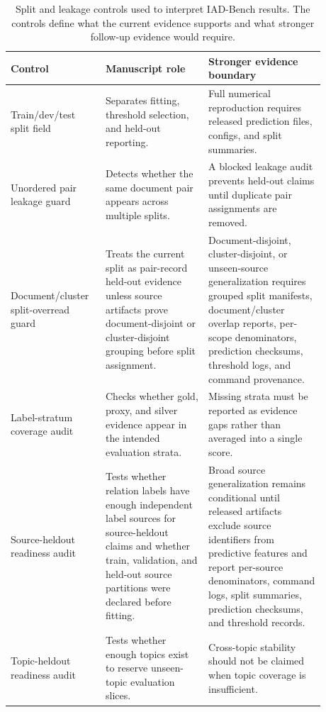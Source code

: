 \documentclass[11pt]{article}
\begin{document}
\begin{table}[H]
\caption{Split and leakage controls used to interpret IAD-Bench results. The controls define what the current evidence supports and what stronger follow-up evidence would require.}
\label{tab:split-leakage-controls}
\centering
\footnotesize
\setlength{\tabcolsep}{3pt}
\begin{tabular}{L{0.24\linewidth}L{0.30\linewidth}L{0.34\linewidth}}
\toprule
Control & Manuscript role & Stronger evidence boundary \\
\midrule
Train/dev/test split field & Separates fitting, threshold selection, and held-out reporting. & Full numerical reproduction requires released prediction files, configs, and split summaries. \\
Unordered pair leakage guard & Detects whether the same document pair appears across multiple splits. & A blocked leakage audit prevents held-out claims until duplicate pair assignments are removed. \\
Document/cluster split-overread guard & Treats the current split as pair-record held-out evidence unless source artifacts prove document-disjoint or cluster-disjoint grouping before split assignment. & Document-disjoint, cluster-disjoint, or unseen-source generalization requires grouped split manifests, document/cluster overlap reports, per-scope denominators, prediction checksums, threshold logs, and command provenance. \\
Label-stratum coverage audit & Checks whether gold, proxy, and silver evidence appear in the intended evaluation strata. & Missing strata must be reported as evidence gaps rather than averaged into a single score. \\
Source-heldout readiness audit & Tests whether relation labels have enough independent label sources for source-heldout claims and whether train, validation, and held-out source partitions were declared before fitting. & Broad source generalization remains conditional until released artifacts exclude source identifiers from predictive features and report per-source denominators, command logs, split summaries, prediction checksums, and threshold records. \\
Topic-heldout readiness audit & Tests whether enough topics exist to reserve unseen-topic evaluation slices. & Cross-topic stability should not be claimed when topic coverage is insufficient. \\
\bottomrule
\end{tabular}
\end{table}
\end{document}
